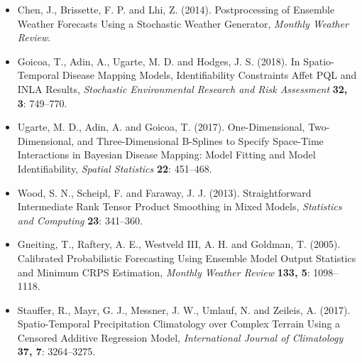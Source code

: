 \documentclass[american,foldmarks=false,noconfig]{uibklttr}
\begin{document}
\begin{itemize}[leftmargin=*]

\item[] Chen, J., Brissette, F. P. and Lhi, Z. (2014). Postprocessing 
of Ensemble Weather Forecasts Using a Stochastic Weather Generator, 
\textit{Monthly Weather Review}.



\item[] Goicoa, T., Adin, A., Ugarte, M. D. and Hodges, J. S. (2018). 
In Spatio-Temporal Disease Mapping Models, Identifiability Constraints 
Affet PQL and INLA Results, \textit{Stochastic Environmental Research 
and Risk Assessment} \textbf{32, 3}: 749--770.

\item[] Ugarte, M. D., Adin, A. and Goicoa, T. (2017). One-Dimensional, 
Two-Dimensional, and Three-Dimensional B-Splines to Specify Space-Time 
Interactions in Bayesian Disease Mapping: Model Fitting and Model 
Identifiability, \textit{Spatial Statistics} \textbf{22}: 451--468.

\item[] Wood, S. N., Scheipl, F. and Faraway, J. J. (2013). 
Straightforward Intermediate Rank Tensor Product Smoothing in Mixed Models, 
\textit{Statistics and Computing} \textbf{23}: 341--360.

\item[] Gneiting, T., Raftery, A. E., Westveld III, A. H. and Goldman, T. (2005). 
Calibrated Probabilistic Forecasting Using Ensemble Model Output Statistics and 
Minimum CRPS Estimation,
\textit{Monthly Weather Review} \textbf{133, 5}: 1098--1118.

\item[] Stauffer, R., Mayr, G. J., Messner, J. W., Umlauf, N. and Zeileis, A. (2017). 
Spatio-Temporal Precipitation Climatology over Complex Terrain Using a Censored Additive Regression Model,
\textit{International Journal of Climatology} \textbf{37, 7}: 3264--3275.


\end{itemize}
\end{document}
